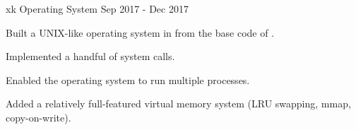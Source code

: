 \begin{cvskills}
    \cvproject
        {xk Operating System}
        {Sep 2017 - Dec 2017}
        {\begin{cvitems} %
            \item{Built a UNIX-like operating system in  from the base code of \href{https://pdos.csail.mit.edu/6.828/2012/xv6.html}{\color{blue}{xv6}}.}
            \item{Implemented a handful of system calls.}
            \item{Enabled the operating system to run multiple processes.}
            \item{Added a relatively full-featured virtual memory system (LRU swapping, mmap, copy-on-write).}
        \end{cvitems}}
\end{cvskills}